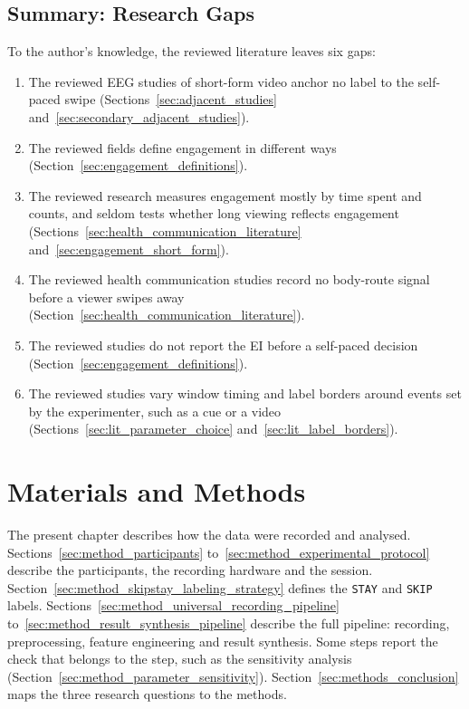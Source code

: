 \documentclass[12pt,a4paper]{report}
\begin{document}
\section{Summary: Research Gaps}
\label{sec:lit_gaps}
To the author's knowledge, the reviewed literature leaves six gaps:
\begin{enumerate}
    \item The reviewed EEG studies of short-form video anchor no label to the self-paced swipe (Sections~\ref{sec:adjacent_studies} and~\ref{sec:secondary_adjacent_studies}).
    \item The reviewed fields define engagement in different ways (Section~\ref{sec:engagement_definitions}).
    \item The reviewed research measures engagement mostly by time spent and counts, and seldom tests whether long viewing reflects engagement (Sections~\ref{sec:health_communication_literature} and~\ref{sec:engagement_short_form}).
    \item The reviewed health communication studies record no body-route signal before a viewer swipes away (Section~\ref{sec:health_communication_literature}).
    \item The reviewed studies do not report the EI before a self-paced decision (Section~\ref{sec:engagement_definitions}).
    \item The reviewed studies vary window timing and label borders around events set by the experimenter, such as a cue or a video (Sections~\ref{sec:lit_parameter_choice} and~\ref{sec:lit_label_borders}).
\end{enumerate}


\chapter{Materials and Methods}
\label{chap:methods}

The present chapter describes how the data were recorded and analysed. Sections~\ref{sec:method_participants} to~\ref{sec:method_experimental_protocol} describe the participants, the recording hardware and the session. Section~\ref{sec:method_skipstay_labeling_strategy} defines the \texttt{STAY} and \texttt{SKIP} labels. Sections~\ref{sec:method_universal_recording_pipeline} to~\ref{sec:method_result_synthesis_pipeline} describe the full pipeline: recording, preprocessing, feature engineering and result synthesis. Some steps report the check that belongs to the step, such as the sensitivity analysis (Section~\ref{sec:method_parameter_sensitivity}). Section~\ref{sec:methods_conclusion} maps the three research questions to the methods.
\end{document}

